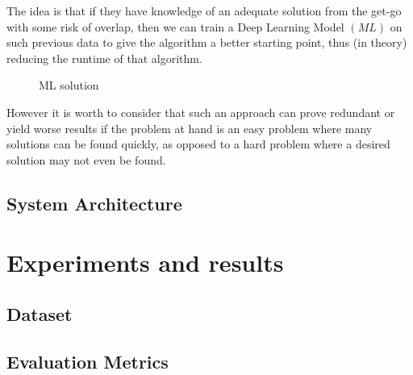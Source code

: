 \documentclass[12pt,a4paper]{report}
\begin{document}
The idea is that if they have knowledge of an adequate solution from the get-go with some risk of overlap, then we can train a Deep Learning Model $(M\!L)$ on such previous data to give the algorithm a better starting point, thus (in theory) reducing the runtime of that algorithm.

\begin{figure}[ht]
    \centering
    \caption{ML solution}
    \label{fig:ml_solution}
\end{figure}

However it is worth to consider that such an approach can prove redundant or yield worse results if the problem at hand is an easy problem where many solutions can be found quickly, as opposed to a hard problem where a desired solution may not even be found. 

\section{System Architecture}
    
\chapter{Experiments and results}
\section{Dataset}
\section{Evaluation Metrics}
\end{document}
